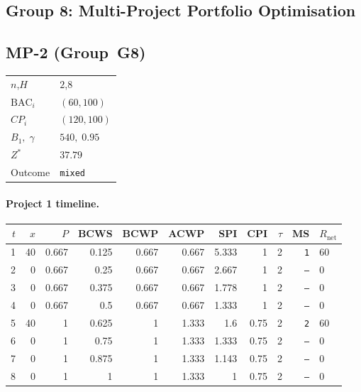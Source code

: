 \documentclass[12pt, a4paper]{article}
\newcommand{\BAC}{\mathrm{BAC}}
\begin{document}
\newpage


\subsection*{Group 8: Multi-Project Portfolio Optimisation}

\subsection*{MP-2  (Group~G8)}
\begin{center}
\begin{tabular}{ll}
\toprule
$n$,\;$H$ & $2$,\;$8$ \\
$\BAC_i$ & $(60, 100)$ \\
$CP_i$   & $(120, 100)$ \\
$B_1,\;\gamma$ & $540,\;0.95$ \\
$Z^*$ & $37.79$ \\
Outcome & \texttt{mixed} \\
\bottomrule
\end{tabular}
\end{center}

\paragraph{Project 1 timeline.}
\begin{center}
\begin{tabular}{rrrrrrrrrrl}
\toprule
$t$ & $x$ & $P$ & BCWS & BCWP & ACWP & SPI & CPI & $\tau$ & MS & $R_{\mathrm{net}}$\\
\midrule
1 & 40 & 0.667 & 0.125 & 0.667 & 0.667 & 5.333 & 1 & 2 & \texttt{1} & 60 \\
2 & 0 & 0.667 & 0.25 & 0.667 & 0.667 & 2.667 & 1 & 2 & \texttt{---} & 0 \\
3 & 0 & 0.667 & 0.375 & 0.667 & 0.667 & 1.778 & 1 & 2 & \texttt{---} & 0 \\
4 & 0 & 0.667 & 0.5 & 0.667 & 0.667 & 1.333 & 1 & 2 & \texttt{---} & 0 \\
5 & 40 & 1 & 0.625 & 1 & 1.333 & 1.6 & 0.75 & 2 & \texttt{2} & 60 \\
6 & 0 & 1 & 0.75 & 1 & 1.333 & 1.333 & 0.75 & 2 & \texttt{---} & 0 \\
7 & 0 & 1 & 0.875 & 1 & 1.333 & 1.143 & 0.75 & 2 & \texttt{---} & 0 \\
8 & 0 & 1 & 1 & 1 & 1.333 & 1 & 0.75 & 2 & \texttt{---} & 0 \\
\bottomrule
\end{tabular}
\end{center}
\end{document}
